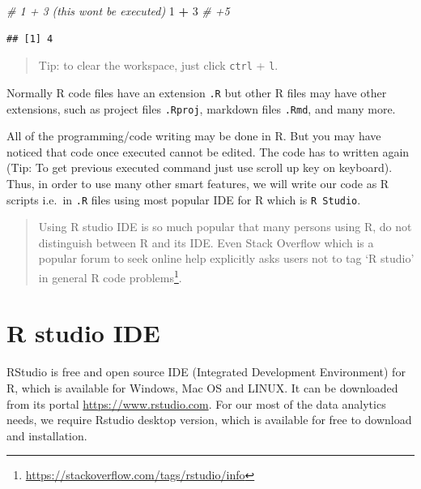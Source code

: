 \documentclass[
]{book}
\newenvironment{Shaded}{\begin{snugshade}}{\end{snugshade}}
\newcommand{\CommentTok}[1]{\textcolor[rgb]{0.56,0.35,0.01}{\textit{#1}}}
\newcommand{\DecValTok}[1]{\textcolor[rgb]{0.00,0.00,0.81}{#1}}
\newcommand{\SpecialCharTok}[1]{\textcolor[rgb]{0.81,0.36,0.00}{\textbf{#1}}}
\begin{document}
\begin{Shaded}
\begin{Highlighting}[]
\CommentTok{\# 1 + 3 (this won\textquotesingle{}t be executed)}
\DecValTok{1} \SpecialCharTok{+} \DecValTok{3} \CommentTok{\# +5}
\end{Highlighting}
\end{Shaded}

\begin{verbatim}
## [1] 4
\end{verbatim}

\begin{quote}
Tip: to clear the workspace, just click \texttt{ctrl} + \texttt{l}.
\end{quote}

Normally R code files have an extension \texttt{.R} but other R files may have other extensions, such as project files \texttt{.Rproj}, markdown files \texttt{.Rmd}, and many more.

All of the programming/code writing may be done in R. But you may have noticed that code once executed cannot be edited. The code has to written again (Tip: To get previous executed command just use scroll up key on keyboard). Thus, in order to use many other smart features, we will write our code as R scripts i.e.~in \texttt{.R} files using most popular IDE for R which is \texttt{R\ Studio}.

\begin{quote}
Using R studio IDE is so much popular that many persons using R, do not distinguish between R and its IDE. Even Stack Overflow which is a popular forum to seek online help explicitly asks users not to tag `R studio' in general R code problems\footnote{\url{https://stackoverflow.com/tags/rstudio/info}}.
\end{quote}

\hypertarget{r-studio-ide}{%
\section{R studio IDE}\label{r-studio-ide}}

RStudio is free and open source IDE (Integrated Development Environment) for R, which is available for Windows, Mac OS and LINUX. It can be downloaded from its portal \href{https://www.rstudio.com/products/rstudio/download/}{https://www.rstudio.com}. For our most of the data analytics needs, we require Rstudio desktop version, which is available for free to download and installation.
\end{document}
